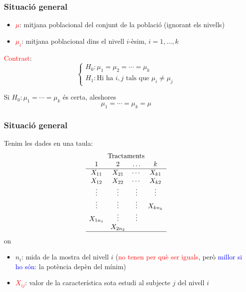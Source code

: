 \documentclass[12pt,t]{beamer}
\newcommand{\red}[1]{\textcolor{red}{#1}}
\newcommand{\blue}[1]{\textcolor{blue}{#1}}
\renewcommand{\emph}[1]{{\color{red}#1}}
\theoremstyle{plain}
\theoremstyle{definition}
\begin{document}
\begin{frame}
\frametitle{Situació general}

\begin{itemize}
\item \red{$\mu$}: mitjana poblacional  del conjunt de la població  (ignorant els nivells)
\medskip

\item \red{$\mu_i$}: mitjana poblacional dins el nivell $i$-èsim,
$i=1,\ldots,k$
\medskip
\end{itemize}\medskip

\red{Contrast}:
$$
\left\{
\begin{array}{l}
H_0 : \mu_1=\mu_{2}=\cdots=\mu_{k} \\
H_1 : \mbox{Hi ha  }i,j\mbox{ tals que }  \mu_i \not=\mu_j
\end{array}
\right.
$$\pause\medskip

Si $H_0: \mu_1=\cdots=\mu_k$ és certa, aleshores
$$
\mu_1=\cdots=\mu_k=\mu
$$

\end{frame}




\begin{frame}
\frametitle{Situació general}

Tenim les dades en una taula:
$$
\begin{array}{c}
\text{Tractaments}\\
\begin{array}{cccc}
 1 & 2 &\ldots & k \\\hline
 X_{11} & X_{21} & \cdots & X_{k1} \\
 X_{12} & X_{22} & \cdots & X_{k2} \\
 \vdots & \vdots & \vdots & \vdots \\
\vdots & \vdots & \vdots & X_{kn_k} \\
X_{1n_1}  & \vdots & \vdots &  \\
 & X_{2n_2} &  &  \\\hline
\end{array}
\end{array}
$$
on 
\begin{itemize}
\item \emph{$n_i$}: mida de la mostra del nivell $i$ (\red{no tenen per què ser iguals}, però  \blue{millor si ho són}: la potència depèn del mínim)\medskip

\item \red{$X_{ij}$}: valor de la característica sota estudi al subjecte $j$ del nivell $i$
\medskip

\end{itemize}
\end{frame}
\end{document}

